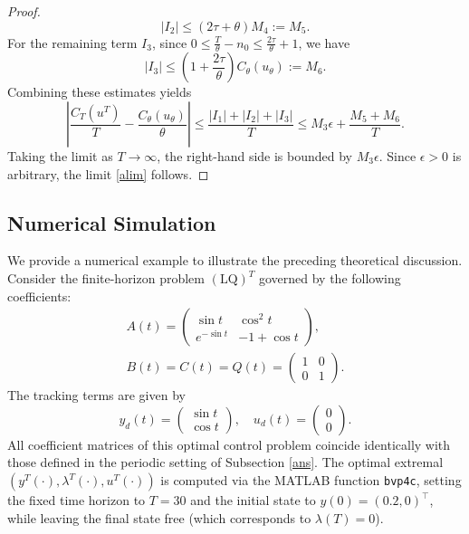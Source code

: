 \documentclass{IEEEtran}
\begin{document}
\begin{proof}
		\begin{equation}\label{i2}
			|I_2| \leq (2\tau + \theta)M_4 := M_5.
		\end{equation}
		For the remaining term $I_3$, since $0 \leq \frac{T}{\theta} - n_0 \leq \frac{2\tau}{\theta} + 1$, we have
		\begin{equation}\label{i3}
			|I_3| \leq \left(1+\frac{2\tau}{\theta}\right) C_{\theta}(u_\theta) := M_6.
		\end{equation}
		Combining these estimates yields
		\begin{equation}
			\left| \frac{C_{T}(u^T)}{T} - \frac{C_{\theta}(u_\theta)}{\theta} \right| \leq \frac{|I_1| + |I_2| + |I_3|}{T} \leq M_3 \epsilon + \frac{M_5 + M_6}{T}.
		\end{equation}
		Taking the limit as $T \to \infty$, the right-hand side is bounded by $M_3 \epsilon$. Since $\epsilon > 0$ is arbitrary, the limit \eqref{alim} follows.
	\end{proof}
	
	
	\subsection{Numerical Simulation}
	
	We provide a numerical example to illustrate the preceding theoretical discussion. Consider the finite-horizon problem $(\text{LQ})^T$ governed by the following coefficients:
	\begin{equation*}
		\begin{split}
			A(t)=
			\begin{pmatrix}
				\sin t & \cos^2 t\\
				e^{-\sin t} & -1+\cos t
			\end{pmatrix},\\
			B(t)=C(t)=Q(t)=
			\begin{pmatrix}
				1 & 0\\
				0 & 1
			\end{pmatrix}.
		\end{split}
	\end{equation*} The tracking terms are given by
	\begin{equation*}
		y_d(t)=
		\begin{pmatrix}
			\sin t\\
			\cos t
		\end{pmatrix},\quad
		u_d(t)=
		\begin{pmatrix}
			0\\
			0
		\end{pmatrix}.
	\end{equation*}
	All coefficient matrices of this optimal control problem coincide identically with those defined in the periodic setting of Subsection \ref{ans}. The optimal extremal $(y^T(\cdot),\lambda^T(\cdot),u^T(\cdot))$ is computed via the MATLAB function \texttt{bvp4c}, setting the fixed time horizon to $T=30$ and the initial state to $y(0)=(0.2,0)^\top$, while leaving the final state free (which corresponds to $\lambda(T)=0$).
	
\end{document}
